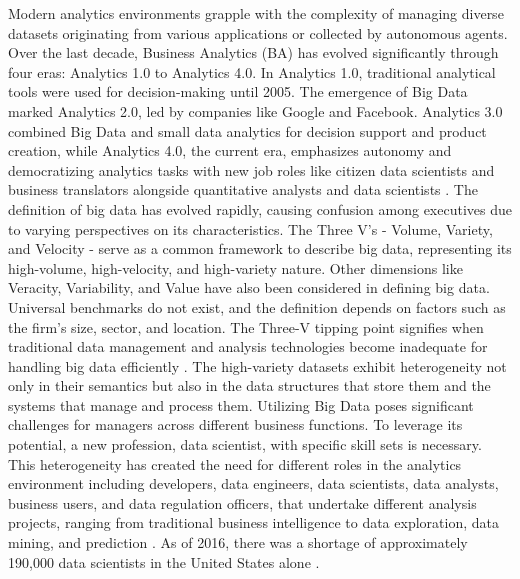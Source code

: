 Modern analytics environments grapple with the complexity of managing diverse datasets originating from various applications or collected by autonomous agents. Over the last decade, Business Analytics (BA) has evolved significantly through four eras: Analytics 1.0 to Analytics 4.0. In Analytics 1.0, traditional analytical tools were used for decision-making until 2005. The emergence of Big Data marked Analytics 2.0, led by companies like Google and Facebook. Analytics 3.0 combined Big Data and small data analytics for decision support and product creation, while Analytics 4.0, the current era, emphasizes autonomy and democratizing analytics tasks with new job roles like citizen data scientists and business translators alongside quantitative analysts and data scientists \cite{Aleksic2019}. The definition of big data has evolved rapidly, causing confusion among executives due to varying perspectives on its characteristics. The Three V's - Volume, Variety, and Velocity - serve as a common framework to describe big data, representing its high-volume, high-velocity, and high-variety nature. Other dimensions like Veracity, Variability, and Value have also been considered in defining big data. Universal benchmarks do not exist, and the definition depends on factors such as the firm's size, sector, and location. The Three-V tipping point signifies when traditional data management and analysis technologies become inadequate for handling big data efficiently \cite{GANDOMI2015137}. The high-variety datasets exhibit heterogeneity not only in their semantics but also in the data structures that store them and the systems that manage and process them. Utilizing Big Data poses significant challenges for managers across different business functions. To leverage its potential, a new profession, data scientist, with specific skill sets is necessary. This heterogeneity has created the need for different roles in the analytics environment including developers, data engineers, data scientists, data analysts, business users, and data regulation officers, that undertake different analysis projects, ranging from traditional business intelligence to data exploration, data mining, and prediction \cite{Mauro2016}. As of 2016, there was a shortage of approximately 190,000 data scientists in the United States alone \cite{Aleksic2019}.

